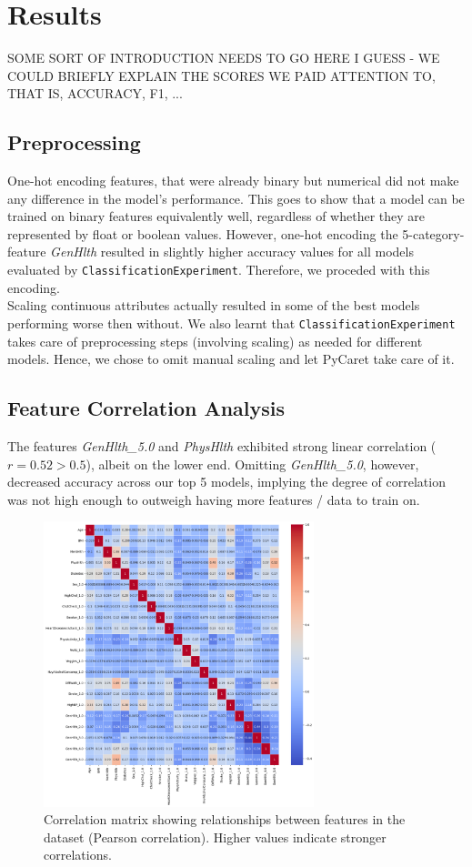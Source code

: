 \documentclass[a4paper,12pt]{article}
\begin{document}
\section{Results}
SOME SORT OF INTRODUCTION NEEDS TO GO HERE I GUESS - WE COULD BRIEFLY EXPLAIN THE SCORES WE PAID ATTENTION TO,
THAT IS, ACCURACY, F1, ...

\subsection{Preprocessing}
One-hot encoding features, that were already binary but numerical did not make any difference in the model's
performance. This goes to show that a model can be trained on binary features equivalently well, regardless
of whether they are represented by float or boolean values. However, one-hot encoding the 5-category-feature
\textit{GenHlth} resulted in slightly higher accuracy values for all models evaluated by \texttt{ClassificationExperiment}.
Therefore, we proceded with this encoding.
\\
Scaling continuous attributes actually resulted in some of the best models performing worse then without.
We also learnt that \texttt{ClassificationExperiment} takes care of preprocessing steps (involving scaling)
as needed for different models. Hence, we chose to omit manual scaling and let PyCaret take care of it.

\subsection{Feature Correlation Analysis}
The features \textit{GenHlth\_5.0} and \textit{PhysHlth} exhibited strong linear correlation ($r = 0.52 > 0.5$),
albeit on the lower end. Omitting \textit{GenHlth\_5.0}, however, decreased accuracy across our top 5 models,
implying the degree of correlation was not high enough to outweigh having more features / data to train 
on.

\begin{figure}[H]
    \centering
    \includegraphics[width=0.7\textwidth]{correlation_matrix.png}
    \caption{Correlation matrix showing relationships between features in the dataset (Pearson correlation). 
    Higher values indicate stronger correlations.}
    \label{fig:correlation_matrix}
\end{figure}
\end{document}
